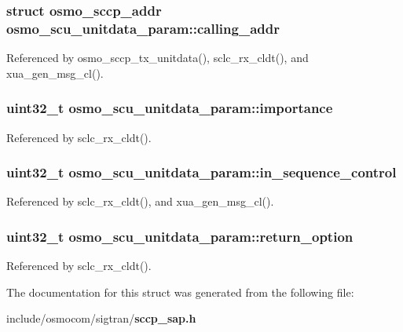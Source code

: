 \subsubsection[{calling\+\_\+addr}]{\setlength{\rightskip}{0pt plus 5cm}struct {\bf osmo\+\_\+sccp\+\_\+addr} osmo\+\_\+scu\+\_\+unitdata\+\_\+param\+::calling\+\_\+addr}\label{structosmo__scu__unitdata__param_a9314985386db550ba06a9b82fdb5d992}


Referenced by osmo\+\_\+sccp\+\_\+tx\+\_\+unitdata(), sclc\+\_\+rx\+\_\+cldt(), and xua\+\_\+gen\+\_\+msg\+\_\+cl().

\subsubsection[{importance}]{\setlength{\rightskip}{0pt plus 5cm}uint32\+\_\+t osmo\+\_\+scu\+\_\+unitdata\+\_\+param\+::importance}\label{structosmo__scu__unitdata__param_ab9f3efef78e6da8a000f944ca912a1af}


Referenced by sclc\+\_\+rx\+\_\+cldt().

\subsubsection[{in\+\_\+sequence\+\_\+control}]{\setlength{\rightskip}{0pt plus 5cm}uint32\+\_\+t osmo\+\_\+scu\+\_\+unitdata\+\_\+param\+::in\+\_\+sequence\+\_\+control}\label{structosmo__scu__unitdata__param_a26c81d2cc83cb643767081fadc4c89a4}


Referenced by sclc\+\_\+rx\+\_\+cldt(), and xua\+\_\+gen\+\_\+msg\+\_\+cl().

\subsubsection[{return\+\_\+option}]{\setlength{\rightskip}{0pt plus 5cm}uint32\+\_\+t osmo\+\_\+scu\+\_\+unitdata\+\_\+param\+::return\+\_\+option}\label{structosmo__scu__unitdata__param_a199a05d3b270edac1a725a4fa4d04b01}


Referenced by sclc\+\_\+rx\+\_\+cldt().



The documentation for this struct was generated from the following file\+:\begin{DoxyCompactItemize}
\item 
include/osmocom/sigtran/{\bf sccp\+\_\+sap.\+h}\end{DoxyCompactItemize}

